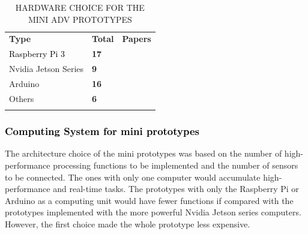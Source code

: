 \documentclass[lettersize,journal]{IEEEtran}
\begin{document}
\begin{table}[!ht]
  \centering
  \captionsetup{
    format=hang,
    justification=raggedright,
    singlelinecheck=false,
    skip=9pt,
  }
  \caption{\MakeUppercase{Hardware Choice for the Mini ADV Prototypes}}
  \label{table:minicomp}
  \def\arraystretch{1.5}
  \begin{tabularx}{\textwidth}{>{\raggedright\arraybackslash}p{3cm}>{\centering\arraybackslash}p{0.7cm}X}
    \arrayrulecolor{white}
    \rowcolor{white}
    \textbf{Type} & \textbf{Total} & \textbf{Papers} \\
    \arrayrulecolor{cor_tabela} \hline
    \textcolor{black}{Raspberry Pi 3} & \cellcolor{cor_tabela}\textbf{17} & \cellcolor{cor_tabela}\cite{pannu2015,aguilar2017,Bechtel2019,al2018,deac2018,jain2018,do2018,Walambe2019,Sahu2019,Sun2019,Sajjad2020,Fathy2020,el2020,chaitra2020,pehlivan2020,ILIE2020530} \\
    \arrayrulecolor{cor_tabela} \hline
    Nvidia Jetson Series & \cellcolor{cor_tabela}\textbf{9} & \cellcolor{cor_tabela}\cite{Karaman2017,kwon2018,Zhou2019,fayjie2018,Wang2019,Febbo2020,10007388,9297973,10.1145/3556548.3559631} \\
    \arrayrulecolor{cor_tabela} \hline
    Arduino & \cellcolor{cor_tabela}\textbf{16} & \cellcolor{cor_tabela}\cite{aguilar2017,azid2017,al2018,jain2018,do2018,Walambe2019,Wang2019,Valocky2019,roestam2019,Febbo2020,Fathy2020,chaitra2020,albin2021design,JRC11091,Hartono_2020,10.1007/978-3-030-55374-6_41} \\
    \arrayrulecolor{cor_tabela} \hline
    Others & \cellcolor{cor_tabela}\textbf{6} & \cellcolor{cor_tabela}\cite{Percinski2018,Gotlib2019,Sun2019,pehlivan2020,P2022108037,9690543} \\
    \arrayrulecolor{cor_tabela} \hline
  \end{tabularx}
\end{table}

\vspace{\baselineskip}

\subsubsection {\textcolor{black}{\textbf{Computing System for mini prototypes}}}

\leavevmode\vspace{0.1\baselineskip}%

The architecture choice of the mini prototypes was based on the number of high-performance processing functions to be implemented and the number of sensors to be connected. The ones with only one computer would accumulate high-performance and real-time tasks. The prototypes with only the Raspberry Pi or Arduino as a computing unit \cite{pannu2015,azid2017,deac2018,Sahu2019,roestam2019,Sajjad2020,el2020} would have fewer functions if compared with the prototypes implemented with the more powerful Nvidia Jetson series computers\cite{Karaman2017,fayjie2018,kwon2018,Zhou2019}. However, the first choice made the whole prototype less expensive.
\end{document}
